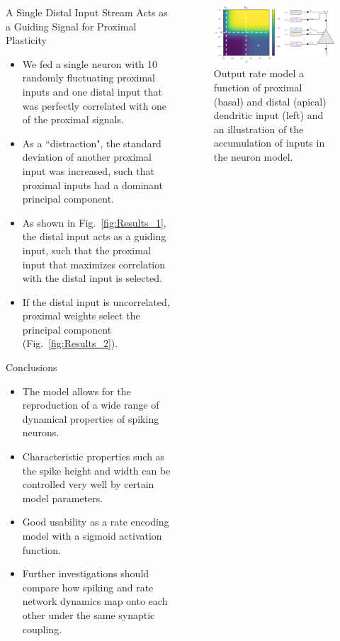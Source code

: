 \documentclass{beamer}
\begin{document}
\begin{frame}[t]
\begin{columns}[t]
\begin{column}{.4\textwidth}
\begin{myblock}{A Single Distal Input Stream Acts as a Guiding Signal for Proximal Plasticity}
\begin{itemize}
\item We fed a single neuron with 10 randomly fluctuating proximal inputs and one distal input that was perfectly correlated with one of the proximal signals. 
\item As a ``distraction", the standard deviation of another proximal input was increased, such that proximal inputs had a dominant principal component.
\item As shown in Fig.~\ref{fig:Results_1}, the distal input acts as a guiding input, such that the proximal input that maximizes correlation with the distal input is selected.
\item If the distal input is uncorrelated, proximal weights select the principal component (Fig.~\ref{fig:Results_2}).
\end{itemize}
\end{myblock}

\begin{myblock}{Conclusions}
\begin{itemize}
\item The model allows for the reproduction of a wide range of dynamical properties of spiking neurons.
\item Characteristic properties such as the spike height and width can be controlled very well by certain model parameters.
\item Good usability as a rate encoding model with a sigmoid activation function.
\item Further investigations should compare how spiking and rate network dynamics map onto each other under the same synaptic coupling.
\end{itemize}
\end{myblock}

\end{column}

\begin{column}{.5\textwidth}
\begin{figure}
\includegraphics[width=\textwidth]{../figures/fig1.pdf}
\caption{Output rate model a function of proximal (basal) and distal (apical) dendritic input (left) and an illustration of the accumulation of inputs in the neuron model.}
\label{fig:Model_Illustration}
\end{figure}


\end{column}
\end{columns}
\end{frame}
\end{document}
